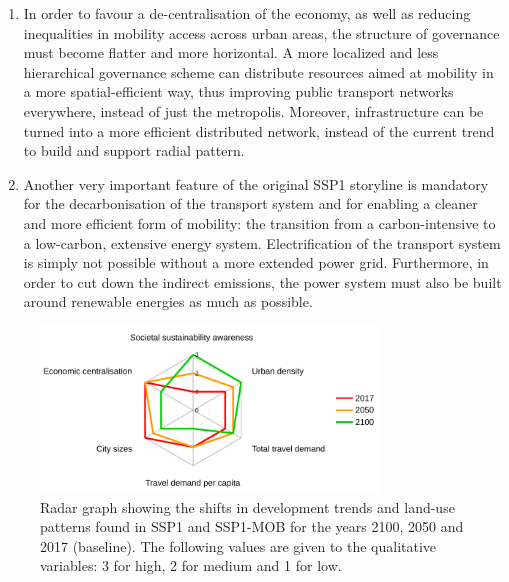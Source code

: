 \begin{enumerate}
\item In order to favour a de-centralisation of the economy, as well as reducing inequalities in mobility access across urban areas, the structure of governance must become flatter and more horizontal. A more localized and less hierarchical governance scheme can distribute resources aimed at mobility in a more spatial-efficient way, thus improving public transport networks everywhere, instead of just the metropolis. Moreover, infrastructure can be turned into a more efficient distributed network, instead of the current trend to build and support radial pattern.
\item Another very important feature of the original SSP1 storyline is mandatory for the decarbonisation of the transport system and for enabling a cleaner and more efficient form of mobility: the transition from a carbon-intensive to a low-carbon, extensive energy system. Electrification of the transport system is simply not possible without a more extended power grid. Furthermore, in order to cut down the indirect  emissions, the power system must also be built around renewable energies as much as possible.
\end{enumerate}

\begin{figure}
\centering
\includegraphics[width=0.8\textwidth]{figures/radar_development-scenario}
\caption[Shifts in development and land-use patterns in SSP1-MOB.]{Radar graph showing the shifts in development trends and land-use patterns found in SSP1 and SSP1-MOB for the years 2100, 2050 and 2017 (baseline). The following values are given to the qualitative variables: 3 for high, 2 for medium and 1 for low.}
\label{f:results:radar_development-scenario}
\end{figure}

